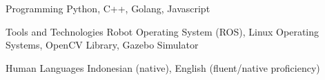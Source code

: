 

\begin{cvskills}

  \cvskill
    {Programming} %
    {Python, C++, Golang, Javascript} %

  \cvskill
    {Tools and Technologies} %
    {Robot Operating System (ROS), Linux Operating Systems, OpenCV Library, Gazebo Simulator} %

  \cvskill
    {Human Languages} %
    {Indonesian (native), English (fluent/native proficiency)} %

\end{cvskills}
